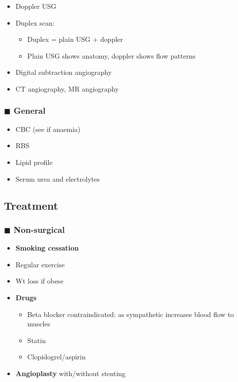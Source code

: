\documentclass[
  12pt,
]{memoir}
\providecommand{\tightlist}{%
  \setlength{\itemsep}{0pt}\setlength{\parskip}{0pt}}
\begin{document}
\begin{itemize}
\tightlist
\item
  Doppler USG
\item
  Duplex scan:

  \begin{itemize}
  \tightlist
  \item
    Duplex = plain USG + doppler
  \item
    Plain USG shows anatomy, doppler shows flow patterns
  \end{itemize}
\item
  Digital subtraction angiography
\item
  CT angiography, MR angiography
\end{itemize}

\hypertarget{blacksquare-general}{%
\subsubsection{\texorpdfstring{\(\blacksquare\)
General}{\textbackslash blacksquare General}}\label{blacksquare-general}}

\begin{itemize}
\tightlist
\item
  CBC (see if anaemia)
\item
  RBS
\item
  Lipid profile
\item
  Serum urea and electrolytes
\end{itemize}

\hypertarget{treatment-3}{%
\subsection{Treatment}\label{treatment-3}}

\hypertarget{blacksquare-non-surgical}{%
\subsubsection{\texorpdfstring{\(\blacksquare\)
Non-surgical}{\textbackslash blacksquare Non-surgical}}\label{blacksquare-non-surgical}}

\begin{itemize}
\tightlist
\item
  \textbf{Smoking cessation}
\item
  Regular exercise
\item
  Wt loss if obese
\item
  \textbf{Drugs}

  \begin{itemize}
  \tightlist
  \item
    Beta blocker contraindicated: as sympathetic increases blood flow to
    muscles
  \item
    Statin
  \item
    Clopidogrel/aspirin
  \end{itemize}
\item
  \textbf{Angioplasty} with/without stenting
\end{itemize}
\end{document}
